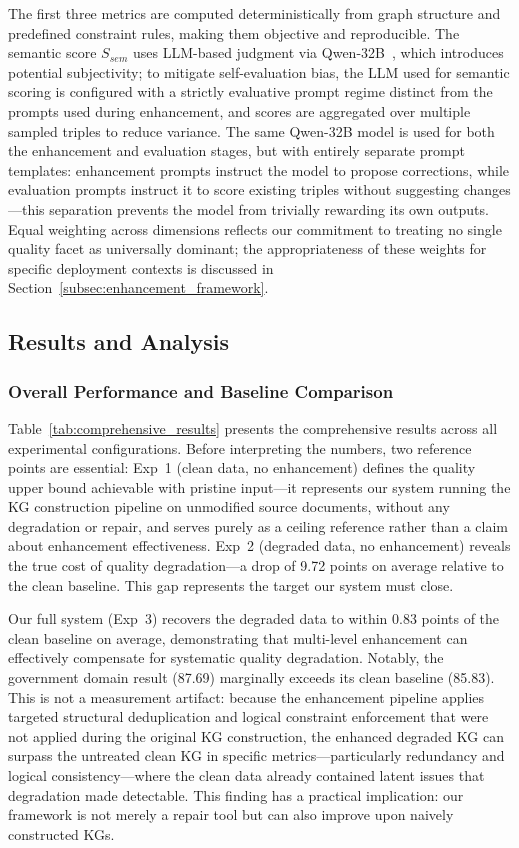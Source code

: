 \documentclass[runningheads]{llncs}
\begin{document}
The first three metrics are computed deterministically from graph structure and predefined constraint rules, making them objective and reproducible. The semantic score $S_{sem}$ uses LLM-based judgment via Qwen-32B~\cite{ref_qwen2025}, which introduces potential subjectivity; to mitigate self-evaluation bias, the LLM used for semantic scoring is configured with a strictly evaluative prompt regime distinct from the prompts used during enhancement, and scores are aggregated over multiple sampled triples to reduce variance. The same Qwen-32B model is used for both the enhancement and evaluation stages, but with entirely separate prompt templates: enhancement prompts instruct the model to propose corrections, while evaluation prompts instruct it to score existing triples without suggesting changes—this separation prevents the model from trivially rewarding its own outputs. Equal weighting across dimensions reflects our commitment to treating no single quality facet as universally dominant; the appropriateness of these weights for specific deployment contexts is discussed in Section~\ref{subsec:enhancement_framework}.

\subsection{Results and Analysis}

\subsubsection{Overall Performance and Baseline Comparison}

Table~\ref{tab:comprehensive_results} presents the comprehensive results across all experimental configurations. Before interpreting the numbers, two reference points are essential: Exp~1 (clean data, no enhancement) defines the quality upper bound achievable with pristine input—it represents our system running the KG construction pipeline on unmodified source documents, without any degradation or repair, and serves purely as a ceiling reference rather than a claim about enhancement effectiveness. Exp~2 (degraded data, no enhancement) reveals the true cost of quality degradation—a drop of 9.72 points on average relative to the clean baseline. This gap represents the target our system must close.

Our full system (Exp~3) recovers the degraded data to within 0.83 points of the clean baseline on average, demonstrating that multi-level enhancement can effectively compensate for systematic quality degradation. Notably, the government domain result (87.69) marginally exceeds its clean baseline (85.83). This is not a measurement artifact: because the enhancement pipeline applies targeted structural deduplication and logical constraint enforcement that were not applied during the original KG construction, the enhanced degraded KG can surpass the untreated clean KG in specific metrics—particularly redundancy and logical consistency—where the clean data already contained latent issues that degradation made detectable. This finding has a practical implication: our framework is not merely a repair tool but can also improve upon naively constructed KGs.
\end{document}
